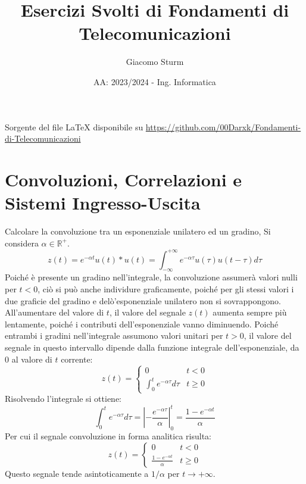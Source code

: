 \documentclass{article}
\title{Esercizi Svolti di Fondamenti di Telecomunicazioni}
\author{Giacomo Sturm}
\date{AA: 2023/2024 - Ing. Informatica}
\begin{document}
\maketitle

\vspace{10mm}

\begin{center}
    Sorgente del file LaTeX disponibile su \url{https://github.com/00Darxk/Fondamenti-di-Telecomunicazioni}
\end{center}

\clearpage

\tableofcontents

\clearpage

\section{Convoluzioni, Correlazioni e Sistemi Ingresso-Uscita}

Calcolare la convoluzione tra un esponenziale unilatero ed un gradino, 
Si considera $\alpha\in\mathbb{R}^+$. 
\begin{equation*}
    z(t)=e^{-\alpha t}u(t)*u(t)=\displaystyle\int_{-\infty}^{+\infty}e^{-\alpha\tau}u(\tau)u(t-\tau)d\tau
\end{equation*}
Poiché è presente un gradino nell'integrale, la convoluzione assumerà valori nulli per $t<0$, ciò si può anche individure graficamente, poiché per gli stessi valori i due 
graficie del gradino e delò'esponenziale unilatero non si sovrappongono. All'aumentare del valore di $t$, il valore del segnale $z(t)$ aumenta sempre più lentamente, poiché i 
contributi dell'esponenziale vanno diminuendo. Poiché entrambi i gradini nell'integrale assumono valori unitari per $t>0$, il valore del segnale in questo intervallo 
dipende dalla funzione integrale dell'esponenziale, da $0$ al valore di $t$ corrente:
\begin{equation*}
    z(t)=\begin{cases}
        0&t<0\\
        \displaystyle\int_0^te^{-\alpha \tau}d\tau&t\geq0
    \end{cases}
\end{equation*}
Risolvendo l'integrale si ottiene:
\begin{equation*}
    \displaystyle\int_0^te^{-\alpha \tau}d\tau=\left|-\frac{e^{-\alpha\tau}}{\alpha}\right|^t_0=\frac{1-e^{-\alpha t}}{\alpha}
\end{equation*}
Per cui il segnale convoluzione in forma analitica risulta:
\begin{equation}
    z(t)=\begin{cases}
        0&t<0\\
        \displaystyle\frac{1-e^{-\alpha t}}{\alpha}&t\geq0
    \end{cases}
\end{equation}
Questo segnale tende asintoticamente a $1/\alpha$ per $t\to+\infty$. 
\end{document}
